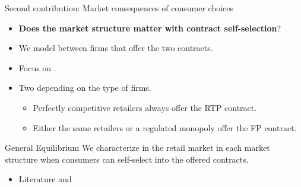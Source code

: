 \documentclass{class}
\begin{document}
\begin{frame}{Second contribution: Market consequences of consumer choices}\label{SecondCont}


\begin{itemize}

\item \textbf{Does the market structure matter with contract self-selection}?  

\vfill

\item We model  between firms that offer the two contracts. 

\vfill

\item Focus on .

\vfill

\item Two  depending on the type of firms.

\begin{itemize}
    \item Perfectly competitive retailers always offer the RTP contract.
    \item Either the same retailers or a regulated monopoly offer the FP contract.
\end{itemize}

\end{itemize}


\vfill

\begin{mainbox}{General Equilibrium}
We characterize  in the retail market in each market structure when consumers can self-select into the offered contracts.
\end{mainbox}

\vfill

\begin{itemize}
\item Literature \hyperlink{Lit_Mkt1}{}  and \hyperlink{Lit_Mkt2}{} 
\end{itemize}


\end{frame}

\end{document}
